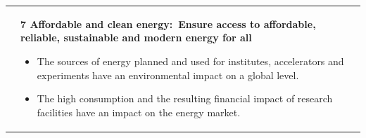 \documentclass[../SustainableHEP.tex]{subfiles}
\begin{document}
\begin{longtable*}{l l}
\parbox[t]{\SDGleft\textwidth}{} & \parbox[t]{\SDGright\textwidth}{\textbf{7 Affordable and clean energy:\ Ensure access to affordable, reliable, sustainable and modern energy for all}
\begin{itemize}[leftmargin=20pt]
\item The sources of energy planned and used for institutes, accelerators and experiments have an environmental impact on a global level.
\item The high consumption and the resulting financial impact of research facilities have an impact on the energy market.
\end{itemize}}\\


\end{longtable*}
\end{document}
